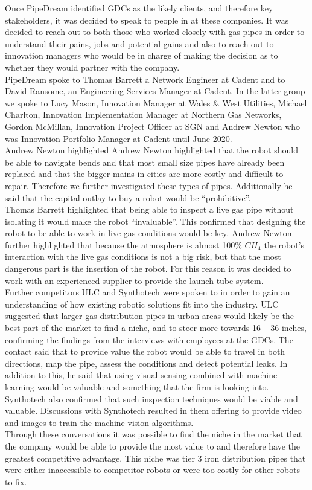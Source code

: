 \documentclass[11pt]{article}		%
\begin{document}
	        Once PipeDream identified GDCs as the likely clients, and therefore key stakeholders, it was decided to speak to people in at these companies. It was decided to reach out to both those who worked closely with gas pipes in order to understand their pains, jobs and potential gains and also to reach out to innovation managers who would be in charge of making the decision as to whether they would partner with the company.
	        \\
	         PipeDream spoke to Thomas Barrett a Network Engineer at Cadent and to David Ransome, an Engineering Services Manager at Cadent. In the latter group we spoke to Lucy Mason, Innovation Manager at Wales \& West Utilities, Michael Charlton, Innovation Implementation Manager at Northern Gas Networks, Gordon McMillan, Innovation Project Officer at SGN and Andrew Newton who was Innovation Portfolio Manager at Cadent until June 2020.
	        \\
	        Andrew Newton highlighted  Andrew Newton highlighted that the robot should be able to navigate bends and that most small size pipes have already been replaced and that the bigger mains in cities are more costly and difficult to repair. Therefore we further investigated these types of pipes. Additionally he said that the capital outlay to buy a robot would be “prohibitive”. 
	        \\
	        Thomas Barrett highlighted that being able to inspect a live gas pipe without isolating it would make the robot “invaluable”. This confirmed that designing the robot to be able to work in live gas conditions would be key. Andrew Newton further highlighted that because the atmosphere is almost 100\% ${CH}_4$ the robot’s interaction with the live gas conditions is not a big risk, but that the most dangerous part is the insertion of the robot. For this reason it was decided to work with an experienced supplier to provide the launch tube system.
	        \\
	        Further competitors ULC and Synthotech were spoken to in order to gain an understanding of how existing robotic solutions fit into the industry. ULC suggested that larger gas distribution pipes in urban areas would likely be the best part of the market to find a niche, and to steer more towards 16 – 36 inches, confirming the findings from the interviews with employees at the GDCs. The contact said that to provide value the robot would be able to travel in both directions, map the pipe, assess the conditions and detect potential leaks. In addition to this, he said that using visual sensing combined with machine learning would be valuable and something that the firm is looking into. Synthotech also confirmed that such inspection techniques would be viable and valuable. Discussions with Synthotech resulted in them offering to provide video and images to train the machine vision algorithms.
	        \\
	        Through these conversations it was possible to find the niche in the market that the company would be able to provide the most value to and therefore have the greatest competitive advantage. This niche was tier 3 iron distribution pipes that were either inaccessible to competitor robots or were too costly for other robots to fix.
        
\end{document}
